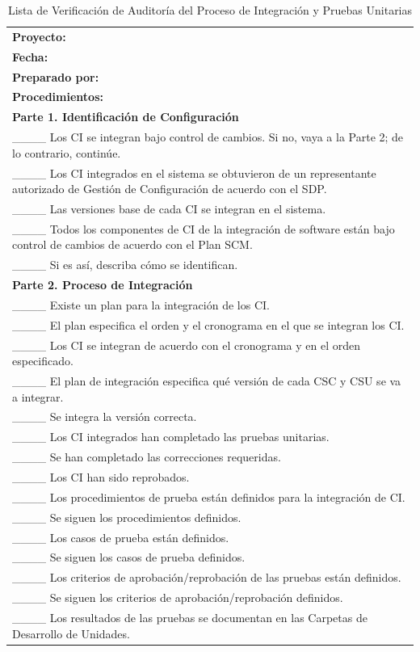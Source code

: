 \begin{table}[H]
\centering
\caption{Lista de Verificación de Auditoría del Proceso de Integración y Pruebas Unitarias}
\label{fig:b8}
\begin{tabular}{|p{14cm}|}
\hline
\textbf{Proyecto:} \\
\textbf{Fecha:} \\
\textbf{Preparado por:} \\
\hline
\textbf{Procedimientos:} \\
\textbf{Parte 1. Identificación de Configuración} \\
\_\_\_\_ Los CI se integran bajo control de cambios. Si no, vaya a la Parte 2; de lo contrario, continúe. \\
\_\_\_\_ Los CI integrados en el sistema se obtuvieron de un representante autorizado de Gestión de Configuración de acuerdo con el SDP. \\
\_\_\_\_ Las versiones base de cada CI se integran en el sistema. \\
\_\_\_\_ Todos los componentes de CI de la integración de software están bajo control de cambios de acuerdo con el Plan SCM. \\
\_\_\_\_ Si es así, describa cómo se identifican. \\
\textbf{Parte 2. Proceso de Integración} \\
\_\_\_\_ Existe un plan para la integración de los CI. \\
\_\_\_\_ El plan especifica el orden y el cronograma en el que se integran los CI. \\
\_\_\_\_ Los CI se integran de acuerdo con el cronograma y en el orden especificado. \\
\_\_\_\_ El plan de integración especifica qué versión de cada CSC y CSU se va a integrar. \\
\_\_\_\_ Se integra la versión correcta. \\
\_\_\_\_ Los CI integrados han completado las pruebas unitarias. \\
\_\_\_\_ Se han completado las correcciones requeridas. \\
\_\_\_\_ Los CI han sido reprobados. \\
\_\_\_\_ Los procedimientos de prueba están definidos para la integración de CI. \\
\_\_\_\_ Se siguen los procedimientos definidos. \\
\_\_\_\_ Los casos de prueba están definidos. \\
\_\_\_\_ Se siguen los casos de prueba definidos. \\
\_\_\_\_ Los criterios de aprobación/reprobación de las pruebas están definidos. \\
\_\_\_\_ Se siguen los criterios de aprobación/reprobación definidos. \\
\_\_\_\_ Los resultados de las pruebas se documentan en las Carpetas de Desarrollo de Unidades. \\
\hline
\end{tabular}
\end{table}

